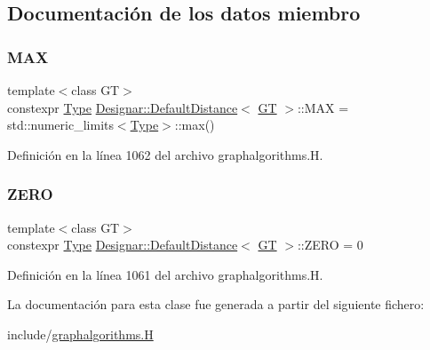 \subsection{Documentación de los datos miembro}
\mbox{\label{class_designar_1_1_default_distance_af1c417705ee2d66f828c0f872607a7ea}} 
\subsubsection{\texorpdfstring{M\+AX}{MAX}}
{\footnotesize\ttfamily template$<$class GT$>$ \\
constexpr \hyperlink{class_designar_1_1_default_distance_a9317a5edf566779550b96edd532b502b}{Type} \hyperlink{class_designar_1_1_default_distance}{Designar\+::\+Default\+Distance}$<$ \hyperlink{demo-buildgraph_8_c_a3001c40d2c31ca87ed96cd7d1334a55e}{GT} $>$\+::M\+AX = std\+::numeric\+\_\+limits$<$\hyperlink{class_designar_1_1_default_distance_a9317a5edf566779550b96edd532b502b}{Type}$>$\+::max()\hspace{0.3cm}{\ttfamily [static]}}



Definición en la línea 1062 del archivo graphalgorithms.\+H.

\mbox{\label{class_designar_1_1_default_distance_abee3d9a2a3f573d6844c0a0fdbd4d7ac}} 
\subsubsection{\texorpdfstring{Z\+E\+RO}{ZERO}}
{\footnotesize\ttfamily template$<$class GT$>$ \\
constexpr \hyperlink{class_designar_1_1_default_distance_a9317a5edf566779550b96edd532b502b}{Type} \hyperlink{class_designar_1_1_default_distance}{Designar\+::\+Default\+Distance}$<$ \hyperlink{demo-buildgraph_8_c_a3001c40d2c31ca87ed96cd7d1334a55e}{GT} $>$\+::Z\+E\+RO = 0\hspace{0.3cm}{\ttfamily [static]}}



Definición en la línea 1061 del archivo graphalgorithms.\+H.



La documentación para esta clase fue generada a partir del siguiente fichero\+:\begin{DoxyCompactItemize}
\item 
include/\hyperlink{graphalgorithms_8_h}{graphalgorithms.\+H}\end{DoxyCompactItemize}
